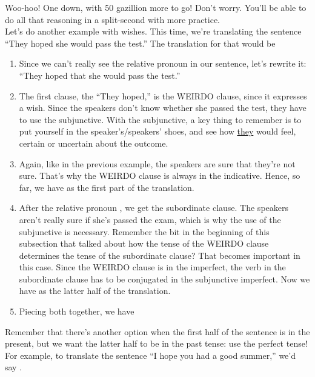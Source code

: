 Woo-hoo! One down, with 50 gazillion more to go! Don't worry. You'll be able to do all that reasoning in a split-second with more practice. \\

Let's do another example with wishes. This time, we're translating the sentence ``They hoped she would pass the test.'' The translation for that would be \\

\begin{enumerate}
	\item Since we can't really see the relative pronoun in our sentence, let's rewrite it: ``They hoped that she would pass the test.''
	\item The first clause, the ``They hoped,'' is the WEIRDO clause, since it expresses a wish. Since the speakers don't know whether she passed the test, they have to use the subjunctive. With the subjunctive, a key thing to remember is to put yourself in the speaker's/speakers' shoes, and see how \underline{they} would feel, certain or uncertain about the outcome. 
	\item Again, like in the previous example, the speakers are sure that they're not sure. That's why the WEIRDO clause is always in the indicative. Hence, so far, we have  as the first part of the translation.
	\item After the relative pronoun , we get the subordinate clause. The speakers aren't really sure if she's passed the exam, which is why the use of the subjunctive is necessary. Remember the bit in the beginning of this subsection that talked about how the tense of the WEIRDO clause determines the tense of the subordinate clause? That becomes important in this case. Since the WEIRDO clause is in the imperfect, the verb in the subordinate clause has to be conjugated in the subjunctive imperfect. Now we have  as the latter half of the translation.
	\item Piecing both together, we have 
\end{enumerate}

Remember that there's another option when the first half of the sentence is in the present, but we want the latter half to be in the past tense: use the perfect tense! For example, to translate the sentence ``I hope you had a good summer,'' we'd say . \\

